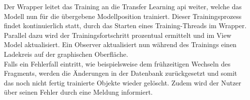 \documentclass[oneside]{ausarbeitung}
\begin{document}
Der Wrapper leitet das Training an die Transfer Learning \ac{api} weiter, welche das Modell nun für die übergebene Modellposition trainiert.
Dieser Trainingsprozess findet kontinuierlich statt, durch das Starten eines Training-Threads im Wrapper.\\
Parallel dazu wird der Trainingsfortschritt prozentual ermittelt und im View Model aktualisiert. Ein Observer aktualisiert nun während des Trainings einen Ladekreis auf der graphischen Oberfläche.\\
Falls ein Fehlerfall eintritt, wie beispielsweise dem frühzeitigen Wechseln des Fragments, werden die Änderungen in der Datenbank zurückgesetzt und somit das noch nicht fertig trainierte Objekte wieder gelöscht. Zudem wird der Nutzer über seinen Fehler durch eine Meldung informiert.\\
\end{document}
